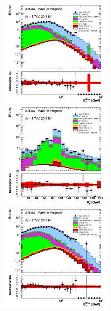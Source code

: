 \begin{figure}[ht!]
\centering
\includegraphics[width=0.495\textwidth]{figures/appendix_signal_selection/Nov24Update_FakeSys_KFacSys_LogY_NoRebin/output/jobs/MxM/DataFull_Rates_May13_FakeRatesExactly2Loose_MuonMxMBJetGt0_ElBJetGt0SubtractPC_MxM/PreselectionNov23_15_1SFOS_ChargeAbs1_BVeto85_physics/weight_all/png/MET_Et_histratio.png}
\includegraphics[width=0.495\textwidth]{figures/appendix_signal_selection/Nov24Update_FakeSys_KFacSys_LogY_NoRebin/output/jobs/MxM/DataFull_Rates_May13_FakeRatesExactly2Loose_MuonMxMBJetGt0_ElBJetGt0SubtractPC_MxM/PreselectionNov23_15_1SFOS_ChargeAbs1_BVeto85_physics/weight_all/png/InvariantMassSFOS_histratio.png}
\includegraphics[width=0.495\textwidth]{figures/appendix_signal_selection/Nov24Update_FakeSys_KFacSys_LogY_NoRebin/output/jobs/MxM/DataFull_Rates_May13_FakeRatesExactly2Loose_MuonMxMBJetGt0_ElBJetGt0SubtractPC_MxM/PreselectionNov23_15_2SFOS_ChargeAbs1_BVeto85_physics/weight_all/png/MET_Et_histratio.png}

\end{figure}
